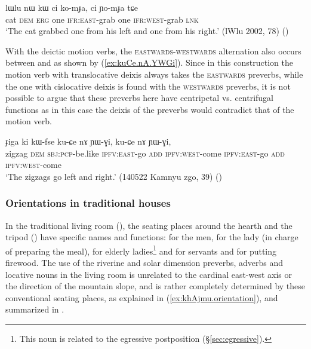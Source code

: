 \begin{exe}
\ex \label{ex:komJA.YomJa}
\gll   lɯlu nɯ kɯ ci ko-mɟa, ci ɲo-mɟa tɕe  \\
 cat \textsc{dem} \textsc{erg} one \textsc{ifr}:\textsc{east}-grab one \textsc{ifr}:\textsc{west}-grab \textsc{lnk}  \\
\glt `The cat grabbed one from his left and one from his right.' (lWlu 2002, 78)
()
\end{exe} 
 
With the deictic motion verbs, the \textsc{eastwards}-\textsc{westwards} alternation also occurs between  and   as shown by (\ref{ex:kuCe.nA.YWGi}). Since in this construction the motion verb with translocative deixis always takes the \textsc{eastwards} preverbs, while the one with cislocative deixis is found with the \textsc{westwards} preverbs, it is not possible to argue that these preverbs here have centripetal vs. centrifugal functions as in this case the deixis of the preverbs would contradict that of the motion verb.
 
 \begin{exe}
\ex \label{ex:kuCe.nA.YWGi}
\gll ɟiga ki kɯ-fse ku-ɕe nɤ ɲɯ-ɣi, ku-ɕe nɤ ɲɯ-ɣi,  \\
zigzag \textsc{dem} \textsc{sbj}:\textsc{pcp}-be.like \textsc{ipfv}:\textsc{east}-go \textsc{add} \textsc{ipfv}:\textsc{west}-come \textsc{ipfv}:\textsc{east}-go \textsc{add} \textsc{ipfv}:\textsc{west}-come \\ 
\glt `The zigzags go left and right.' (140522 Kamnyu zgo, 39) 	()
\end{exe} 

\subsubsection{Orientations in traditional houses}  \label{sec:orientation.kitchen}
In the traditional living room (), the seating places around the hearth and the tripod () have specific names and functions:  for the men,  for the lady (in charge of preparing the meal),  for elderly ladies\footnote{This noun is related to the egressive postposition  (§\ref{sec:egressive}). } and  for servants and for putting firewood. The use of the riverine and solar dimension preverbs, adverbs and locative nouns in the living room is unrelated to the cardinal east-west axis or the direction of the mountain slope, and is rather completely determined by these conventional seating places, as explained in (\ref{ex:khAjmu.orientation}), and summarized in .

